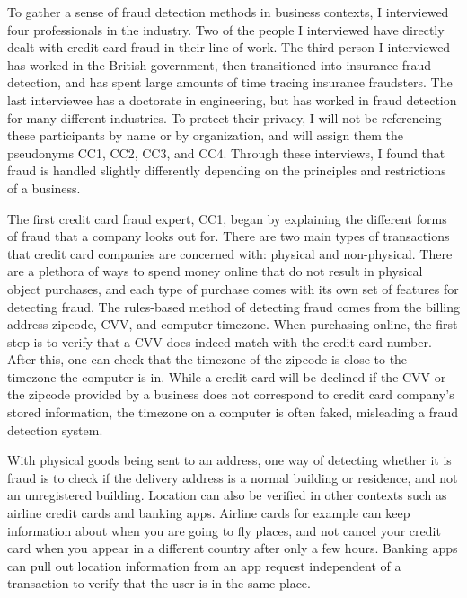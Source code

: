 \documentclass[midd]{thesis}
\begin{document}
To gather a sense of fraud detection methods in business contexts, I interviewed four professionals in the industry. Two of the people I interviewed have directly dealt with credit card fraud in their line of work. The third person I interviewed has worked in the British government, then transitioned into insurance fraud detection, and has spent large amounts of time tracing insurance fraudsters. The last interviewee has a doctorate in engineering, but has worked in fraud detection for many different industries. To protect their privacy, I will not be referencing these participants by name or by organization, and will assign them the pseudonyms CC1, CC2, CC3, and CC4. Through these interviews, I found that fraud is handled slightly differently depending on the principles and restrictions of a business.

The first credit card fraud expert, CC1, began by explaining the different forms of fraud that a company looks out for. There are two main types of transactions that credit card companies are concerned with: physical and non-physical. There are a plethora of ways to spend money online that do not result in physical object purchases, and each type of purchase comes with its own set of features for detecting fraud. The rules-based method of detecting fraud comes from the billing address zipcode, CVV, and computer timezone. When purchasing online, the first step is to verify that a CVV does indeed match with the credit card number. After this, one can check that the timezone of the zipcode is close to the timezone the computer is in. While a credit card will be declined if the CVV or the zipcode provided by a business does not correspond to credit card company's stored information, the timezone on a computer is often faked, misleading a fraud detection system. 

With physical goods being sent to an address, one way of detecting whether it is fraud is to check if the delivery address is a normal building or residence, and not an unregistered building. Location can also be verified in other contexts such as airline credit cards and banking apps. Airline cards for example can keep information about when you are going to fly places, and not cancel your credit card when you appear in a different country after only a few hours. Banking apps can pull out location information from an app request independent of a transaction to verify that the user is in the same place.
\end{document}
